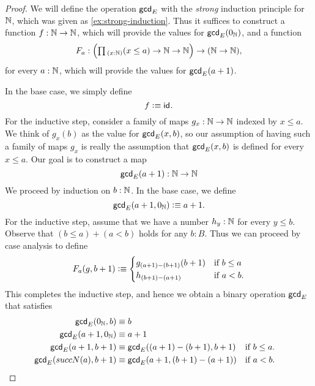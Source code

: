 \begin{proof}
  We will define the operation $\mathsf{gcd}_E$ with the \emph{strong} induction principle for ${\mathbb{N}}$, which was given as \cref{ex:strong-induction}. Thus it suffices to construct a function $f:{\mathbb{N}}\to{\mathbb{N}}$, which will provide the values for $\mathsf{gcd}_E(0_{{\mathbb{N}}})$, and a function
  \begin{equation*}
    F_a : \Big(\prd{x:\N}(x\leq a) \to \N\to\N\Big)\to (\N\to\N),
  \end{equation*}
  for every $a:{\mathbb{N}}$, which will provide the values for $\mathsf{gcd}_E(a+1)$.

  In the base case, we simply define
  \begin{equation*}
    f\vcentcolon\equiv\mathsf{id}_{}.
  \end{equation*}
  For the inductive step, consider a family of maps $g_x:{\mathbb{N}}\to{\mathbb{N}}$ indexed by $x\leq a$. We think of $g_x(b)$ as the value for $\mathsf{gcd}_E(x,b)$, so our assumption of having such a family of maps $g_x$ is really the assumption that $\mathsf{gcd}_E(x,b)$ is defined for every $x\leq a$. Our goal is to construct a map
  \begin{equation*}
    \mathsf{gcd}_E(a+1):{\mathbb{N}}\to{\mathbb{N}}
  \end{equation*}
  We proceed by induction on $b:{\mathbb{N}}$. In the base case, we define
  \begin{equation*}
    \mathsf{gcd}_E(a+1,0_{{\mathbb{N}}})\vcentcolon\equiv a+1.
  \end{equation*}
  For the inductive step, assume that we have a number $h_y:{\mathbb{N}}$ for every $y\leq b$. Observe that $(b\leq a)+(a<b)$ holds for any $b:B$. Thus we can proceed by case analysis to define
  \begin{equation*}
    F_a(g,b+1)\vcentcolon\equiv
    \begin{cases}
      g_{(a+1)-(b+1)}(b+1) & \text{if }b\leq a\\
      h_{(b+1)-(a+1)} & \text{if }a<b.
    \end{cases}
  \end{equation*}
  This completes the inductive step, and hence we obtain a binary operation
  $\mathsf{gcd}_E$ that satisfies
  \begin{align*}
    \mathsf{gcd}_E(0_{{\mathbb{N}}},b) & \equiv b \\
    \mathsf{gcd}_E(a+1,0_{{\mathbb{N}}}) & \equiv a+1 \\
    \mathsf{gcd}_E(a+1,b+1) & \equiv \mathsf{gcd}_E((a+1)-(b+1),b+1) & & \text{if }b\leq a.\\
    \mathsf{gcd}_E(succN(a),b+1) & \equiv \mathsf{gcd}_E(a+1,(b+1)-(a+1)) & & \text{if }a<b.\qedhere            
  \end{align*}
\end{proof}

